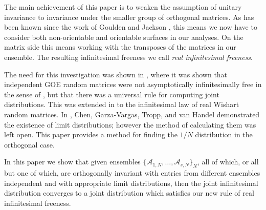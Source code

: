 \documentclass[11pt]{amsart}
\theoremstyle{definition}
\numberwithin{theorem}{section}
\newcommand{\cA}{\mathcal{A}}
\newcommand{\sN}{{\scriptscriptstyle N}}
\begin{document}
The main achievement of this paper is to weaken the
assumption of unitary invariance to invariance under the
smaller group of orthogonal matrices. As has been known
since the work of Goulden and Jackson \cite{gj}, this means
we now have to consider both non-orientable and orientable
surfaces in our analyses. On the matrix side this means
working with the transposes of the matrices in our
ensemble. The resulting infinitesimal freeness we call
\textit{real infinitesimal freeness}.

The need for this investigation was shown in \cite{m}, where
it was shown that independent GOE random matrices were not
asymptotically infinitesimally free in the sense of
\cite{fn}, but that there was a universal rule for computing
joint distributions. This was extended in \cite{mvb} to the
infinitesimal law of real Wishart random matrices. In
\cite{cgth}, Chen, Garza-Vargas, Tropp, and van Handel
demonstrated the existence of limit distributions; however
the method of calculating them was left open. This paper
provides a method for finding the $1/N$ distribution in the
orthogonal case.

In this paper we show that given ensembles $\{ \cA_{1, \sN},
\dots, \cA_{s, \sN} \}_N$, all of which, or all but one of
which, are orthogonally invariant with entries from
different ensembles independent and with appropriate limit
distributions, then the joint infinitesimal distribution
converges to a joint distribution which satisfies our new
rule of real infinitesimal freeness.
\end{document}
